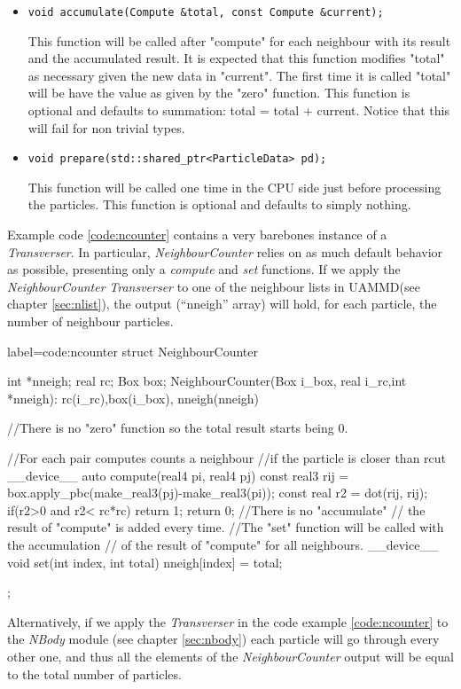 \documentclass[ twoside,openright,titlepage,numbers=noenddot,%
headinclude,footinclude,cleardoublepage=empty,abstract=on,
BCOR=5mm,paper=a4,fontsize=11pt, dvipsnames
]{scrreprt}
\def\ucpp{uammd_cpp_lexer.py:UAMMDCppLexer -x}
\newcommand{\uammd}{\gls{UAMMD}\xspace}
\begin{document}
\begin{itemize}
 \item \texttt{void accumulate(Compute &total, const Compute &current);}

   
  This function will be called after "compute" for each neighbour with its result and the accumulated result.
  It is expected that this function modifies "total" as necessary given the new data in "current".
  The first time it is called "total" will be have the value as given by the "zero" function.
  This function is optional and defaults to summation: total = total + current. Notice that this will fail for non trivial types.
     
\item \texttt{void prepare(std::shared_ptr<ParticleData> pd);}

  
  This function will be called one time in the CPU side just before processing the particles.
  This function is optional and defaults to simply nothing.
 \end{itemize}

Example code \ref{code:ncounter} contains a very barebones instance of a \emph{Transverser}. In particular, \emph{NeighbourCounter} relies on as much default behavior as possible, presenting only a \emph{compute} and \emph{set} functions.
If we apply the \emph{NeighbourCounter} \emph{Transverser} to one of the neighbour lists in \uammd (see chapter \ref{sec:nlist}), the output (``nneigh'' array) will hold, for each particle, the number of neighbour particles.
\begin{code2}{label=code:ncounter}
struct NeighbourCounter{
  int *nneigh;
  real rc;
  Box box;
  NeighbourCounter(Box i_box, real i_rc,int *nneigh):
    rc(i_rc),box(i_box),
    nneigh(nneigh){}

  //There is no "zero" function so the total result starts being 0.
  
  //For each pair computes counts a neighbour 
  //if the particle is closer than rcut
  __device__ auto compute(real4 pi, real4 pj){
    const real3 rij = box.apply_pbc(make_real3(pj)-make_real3(pi));
    const real r2 = dot(rij, rij);
    if(r2>0 and r2< rc*rc){
      return 1;
    }
    return 0;
  }
  //There is no "accumulate"
  // the result of "compute" is added every time.
  //The "set" function will be called with the accumulation
  // of the result of "compute" for all neighbours. 
  __device__ void set(int index, int total){
    nneigh[index] = total;
  }
};
\end{code2}
Alternatively, if we apply the \emph{Transverser} in the code example \ref{code:ncounter} to the \emph{NBody} module (see chapter \ref{sec:nbody}) each particle will go through every other one, and thus all the elements of the \emph{NeighbourCounter} output will be equal to the total number of particles.
\end{document}
